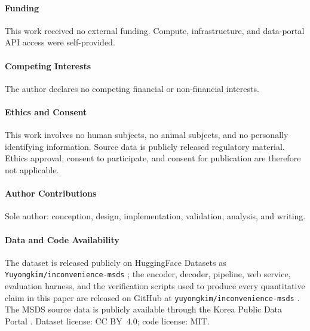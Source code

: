 \documentclass[smallextended]{svjour3}
\begin{document}
\paragraph{Funding}
This work received no external funding. Compute, infrastructure, and data-portal API access were self-provided.

\paragraph{Competing Interests}
The author declares no competing financial or non-financial interests.

\paragraph{Ethics and Consent}
This work involves no human subjects, no animal subjects, and no personally identifying information. Source data is publicly released regulatory material. Ethics approval, consent to participate, and consent for publication are therefore not applicable.

\paragraph{Author Contributions}
Sole author: conception, design, implementation, validation, analysis, and writing.

\paragraph{Data and Code Availability}
The dataset is released publicly on HuggingFace Datasets as \texttt{Yuyongkim/inconvenience-msds} \cite{hf_dataset}; the encoder, decoder, pipeline, web service, evaluation harness, and the verification scripts used to produce every quantitative claim in this paper are released on GitHub at \texttt{yuyongkim/inconvenience-msds} \cite{github_repo}. The MSDS source data is publicly available through the Korea Public Data Portal \cite{data_go_kr}. Dataset license: CC BY~4.0; code license: MIT.



\end{document}
